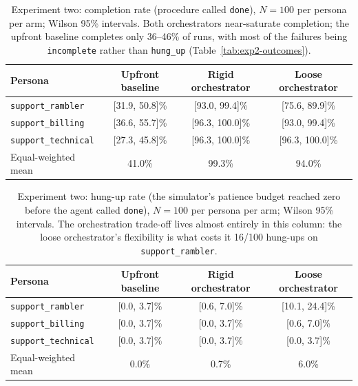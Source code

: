 \documentclass[11pt,a4paper]{article}
\newcommand{\rerunPlaceholderN}{100}
\begin{document}
\begin{table}[htbp]
  \centering
  \caption{Experiment two: completion rate (procedure called \texttt{done}), $N=\rerunPlaceholderN$ per persona per arm; Wilson 95\% intervals. Both orchestrators near-saturate completion; the upfront baseline completes only 36--46\% of runs, with most of the failures being \texttt{incomplete} rather than \texttt{hung\_up} (Table~\ref{tab:exp2-outcomes}).}
  \label{tab:exp2-completion}
  \begin{tabular}{lccc}
    \toprule
    Persona & Upfront baseline & Rigid orchestrator & Loose orchestrator \\
    \midrule
    \texttt{support\_rambler}   & [31.9, 50.8]\% & [93.0, 99.4]\%  & [75.6, 89.9]\%  \\
    \texttt{support\_billing}   & [36.6, 55.7]\% & [96.3, 100.0]\% & [93.0, 99.4]\%  \\
    \texttt{support\_technical} & [27.3, 45.8]\% & [96.3, 100.0]\% & [96.3, 100.0]\% \\
    \midrule
    Equal-weighted mean         & 41.0\%         & 99.3\%          & 94.0\%          \\
    \bottomrule
  \end{tabular}
\end{table}

\begin{table}[htbp]
  \centering
  \caption{Experiment two: hung-up rate (the simulator's patience budget reached zero before the agent called \texttt{done}), $N=\rerunPlaceholderN$ per persona per arm; Wilson 95\% intervals. The orchestration trade-off lives almost entirely in this column: the loose orchestrator's flexibility is what costs it 16/100 hung-ups on \texttt{support\_rambler}.}
  \label{tab:exp2-hungup}
  \begin{tabular}{lccc}
    \toprule
    Persona & Upfront baseline & Rigid orchestrator & Loose orchestrator \\
    \midrule
    \texttt{support\_rambler}   & [0.0, 3.7]\% & [0.6, 7.0]\% & [10.1, 24.4]\% \\
    \texttt{support\_billing}   & [0.0, 3.7]\% & [0.0, 3.7]\% & [0.6, 7.0]\%   \\
    \texttt{support\_technical} & [0.0, 3.7]\% & [0.0, 3.7]\% & [0.0, 3.7]\%   \\
    \midrule
    Equal-weighted mean         & 0.0\%        & 0.7\%        & 6.0\%          \\
    \bottomrule
  \end{tabular}
\end{table}
\end{document}
